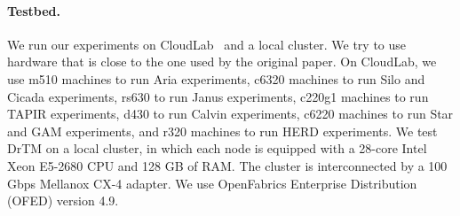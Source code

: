 \paragraph{Testbed.}
We run our experiments on CloudLab~\cite{cloudlab} and a local cluster.
We try to use hardware that is close to the one used by the original paper.
On CloudLab, we use m510 machines to
run Aria experiments, c6320 machines to run Silo and Cicada experiments, rs630
to run Janus experiments, c220g1 machines to run TAPIR experiments, d430 to run
Calvin experiments, c6220 machines to run Star and GAM experiments, and r320 machines to run HERD experiments.
We test DrTM on a local cluster, in which each node is equipped
with a 28-core Intel Xeon E5-2680 CPU and 128 GB of RAM. The cluster is interconnected by a 100 Gbps Mellanox CX-4 adapter.
We use OpenFabrics Enterprise Distribution (OFED) version 4.9.
